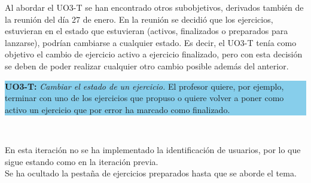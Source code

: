 Al abordar el UO3-T se han encontrado otros subobjetivos, derivados también de la reunión del día 27 de enero. En la reunión se decidió que los ejercicios, estuvieran en el estado que estuvieran (activos, finalizados o preparados para lanzarse), podrían cambiarse a cualquier estado. Es decir, el UO3-T tenía como objetivo el cambio de ejercicio activo a ejercicio finalizado, pero con esta decisión se deben de poder realizar cualquier otro cambio posible además del anterior.\\

\vspace{0.1cm}

\colorbox{SkyBlue}{\parbox[c]{1.0\textwidth}{
\textbf{UO3-T:} \textit{Cambiar el estado de un ejercicio.} El profesor quiere, por ejemplo, terminar con uno de los ejercicios que propuso o quiere volver a poner como activo un ejercicio que por error ha marcado como finalizado.\\
}}\\

\vspace{0.1cm}

En esta iteración no se ha implementado la identificación de usuarios, por lo que sigue estando como en la iteración previa.\\

Se ha ocultado la pestaña de ejercicios preparados hasta que se aborde el tema.\\